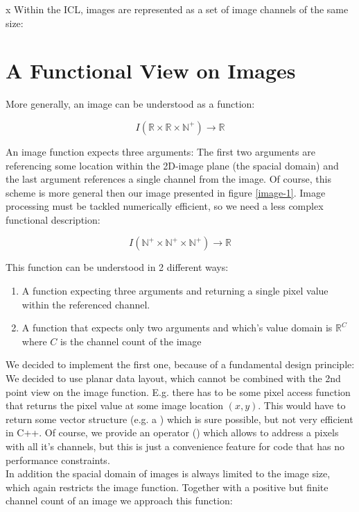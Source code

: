 x Within the ICL, images are represented as a set of image channels of the same size:



\section{A Functional View on Images}
More generally, an image can be understood as a function:

\begin{equation}
I(\mathbb{R} \times{} \mathbb{R} \times{} \mathbb{N^+} )\rightarrow\mathbb{R} 
\end{equation}

An image function expects three arguments: The first two arguments are referencing some location within the 2D-image plane (the spacial domain) and the last argument references a single channel from the image. Of course, this scheme is more general then our image presented in figure \ref{image-1}. Image processing must be tackled numerically efficient, so we need a less complex functional description:

\begin{equation}
  I(\mathbb{N^+} \times{} \mathbb{N^+} \times{} \mathbb{N^+} )\rightarrow\mathbb{R} 
\end{equation}


This function can be understood in 2 different ways:
\begin{enumerate}
 \item A function expecting three arguments and returning a single pixel value within the referenced channel.
 \item A function that expects only two arguments and which's value domain is $\mathbb{R}^C$ where $C$ is the channel count of the image
\end{enumerate} 

We decided to implement the first one, because of a fundamental design principle: We decided to use planar data layout, which cannot be combined with the 2nd point view on the image function. E.g. there has to be some pixel access function that returns the pixel value at some image location $(x,y)$. This would have to return some vector structure (e.g. a ) which is sure possible, but not very efficient in C++.
Of course, we provide an operator () which allows to address a pixels with all it's channels, but this is just a convenience feature for code that has no performance constraints.\\
In addition the spacial domain of images is always limited to the image size, which again restricts the image function. Together with a positive but finite channel count of an image we approach this function:


